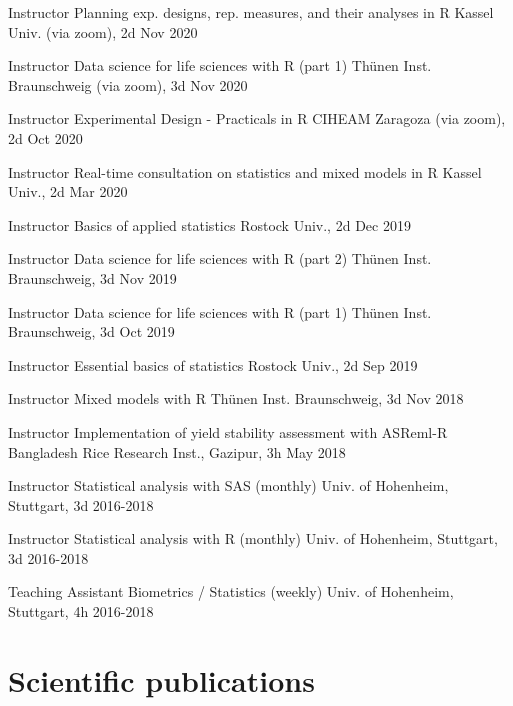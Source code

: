 \documentclass[11pt, a4paper]{awesome-cv}
\begin{document}
\begin{cvhonors}

  \cvhonor
    {Instructor  }
    {Planning exp. designs, rep. measures, and their analyses in R}
    {Kassel Univ. (via zoom), 2d}
    {Nov 2020  }
    
  \cvhonor
    {Instructor  }
    {Data science for life sciences with R (part 1)}
    {Thünen Inst. Braunschweig (via zoom), 3d}
    {Nov 2020  } 
    
  \cvhonor
    {Instructor  }
    {Experimental Design - Practicals in R}
    {CIHEAM Zaragoza (via zoom), 2d}
    {Oct 2020  }

  \cvhonor
    {Instructor  }
    {Real-time consultation on statistics and mixed models in R}
    {Kassel Univ., 2d}
    {Mar 2020  }
    
  \cvhonor
    {Instructor  }
    {Basics of applied statistics}
    {Rostock Univ., 2d}
    {Dec 2019  }
  
  \cvhonor
    {Instructor  }
    {Data science for life sciences with R (part 2)}
    {Thünen Inst. Braunschweig, 3d}
    {Nov 2019  }    

  \cvhonor
    {Instructor  }
    {Data science for life sciences with R (part 1)}
    {Thünen Inst. Braunschweig, 3d}
    {Oct 2019  }      

  \cvhonor
    {Instructor  }
    {Essential basics of statistics}
    {Rostock Univ., 2d}
    {Sep 2019  }  

  \cvhonor
    {Instructor  }
    {Mixed models with R}
    {Thünen Inst. Braunschweig, 3d}
    {Nov 2018  }  
    
  \cvhonor
    {Instructor  }
    {Implementation of yield stability assessment with ASReml-R}
    {Bangladesh Rice Research Inst., Gazipur, 3h}
    {May 2018  }
    
  \cvhonor
    {Instructor  }
    {Statistical analysis with SAS (monthly)}
    {Univ. of Hohenheim, Stuttgart, 3d}
    {2016-2018  }
    
  \cvhonor
    {Instructor  }
    {Statistical analysis with R (monthly)}
    {Univ. of Hohenheim, Stuttgart, 3d}
    {2016-2018  }
    
  \cvhonor
    {Teaching Assistant  }
    {Biometrics / Statistics (weekly)}
    {Univ. of Hohenheim, Stuttgart, 4h}
    {2016-2018  }
        
\end{cvhonors}

\hypertarget{scientific-publications}{%
\section{Scientific publications}\label{scientific-publications}}
\end{document}
